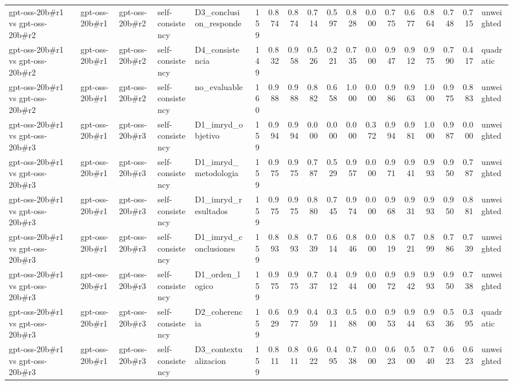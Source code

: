 \begin{table}
{\begin{tabular}{lllllrrrrrrrrrrrrl}
gpt-oss-20b\#r1 vs gpt-oss-20b\#r2 & gpt-oss-20b\#r1 & gpt-oss-20b\#r2 & self-consistency & D3\_conclusion\_responde & 159 & 0.874 & 0.874 & 0.714 & 0.597 & 0.828 & 0.000 & 0.775 & 0.677 & 0.864 & 0.748 & 0.715 & unweighted \\
gpt-oss-20b\#r1 vs gpt-oss-20b\#r2 & gpt-oss-20b\#r1 & gpt-oss-20b\#r2 & self-consistency & D4\_consistencia & 149 & 0.832 & 0.958 & 0.526 & 0.221 & 0.735 & 0.000 & 0.947 & 0.912 & 0.975 & 0.790 & 0.417 & quadratic \\
gpt-oss-20b\#r1 vs gpt-oss-20b\#r2 & gpt-oss-20b\#r1 & gpt-oss-20b\#r2 & self-consistency & no\_evaluable & 160 & 0.988 & 0.988 & 0.882 & 0.658 & 1.000 & 0.000 & 0.986 & 0.963 & 1.000 & 0.975 & 0.883 & unweighted \\
gpt-oss-20b\#r1 vs gpt-oss-20b\#r3 & gpt-oss-20b\#r1 & gpt-oss-20b\#r3 & self-consistency & D1\_imryd\_objetivo & 159 & 0.994 & 0.994 & 0.000 & 0.000 & 0.000 & 0.372 & 0.994 & 0.981 & 1.000 & 0.987 & 0.000 & unweighted \\
gpt-oss-20b\#r1 vs gpt-oss-20b\#r3 & gpt-oss-20b\#r1 & gpt-oss-20b\#r3 & self-consistency & D1\_imryd\_metodologia & 159 & 0.975 & 0.975 & 0.787 & 0.529 & 0.957 & 0.000 & 0.971 & 0.941 & 0.993 & 0.950 & 0.787 & unweighted \\
gpt-oss-20b\#r1 vs gpt-oss-20b\#r3 & gpt-oss-20b\#r1 & gpt-oss-20b\#r3 & self-consistency & D1\_imryd\_resultados & 159 & 0.975 & 0.975 & 0.880 & 0.745 & 0.974 & 0.000 & 0.968 & 0.931 & 0.993 & 0.950 & 0.881 & unweighted \\
gpt-oss-20b\#r1 vs gpt-oss-20b\#r3 & gpt-oss-20b\#r1 & gpt-oss-20b\#r3 & self-consistency & D1\_imryd\_conclusiones & 159 & 0.893 & 0.893 & 0.739 & 0.614 & 0.846 & 0.000 & 0.819 & 0.721 & 0.899 & 0.786 & 0.739 & unweighted \\
gpt-oss-20b\#r1 vs gpt-oss-20b\#r3 & gpt-oss-20b\#r1 & gpt-oss-20b\#r3 & self-consistency & D1\_orden\_logico & 159 & 0.975 & 0.975 & 0.737 & 0.412 & 0.944 & 0.000 & 0.972 & 0.942 & 0.993 & 0.950 & 0.738 & unweighted \\
gpt-oss-20b\#r1 vs gpt-oss-20b\#r3 & gpt-oss-20b\#r1 & gpt-oss-20b\#r3 & self-consistency & D2\_coherencia & 159 & 0.629 & 0.977 & 0.459 & 0.311 & 0.588 & 0.000 & 0.953 & 0.944 & 0.963 & 0.536 & 0.395 & quadratic \\
gpt-oss-20b\#r1 vs gpt-oss-20b\#r3 & gpt-oss-20b\#r1 & gpt-oss-20b\#r3 & self-consistency & D3\_contextualizacion & 159 & 0.811 & 0.811 & 0.622 & 0.495 & 0.738 & 0.000 & 0.623 & 0.500 & 0.740 & 0.623 & 0.623 & unweighted \\

\end{tabular}}
\end{table}
